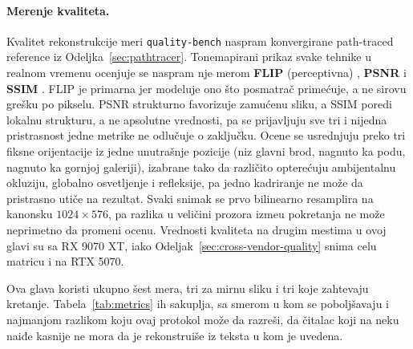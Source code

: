 \paragraph{Merenje kvaliteta.} Kvalitet rekonstrukcije meri \texttt{quality-bench} naspram
konvergirane path-traced reference iz Odeljka~\ref{sec:pathtracer}. Tonemapirani prikaz svake tehnike u realnom vremenu
ocenjuje se naspram nje merom \textbf{FLIP} (perceptivna) \cite{andersson2020flip},
\textbf{PSNR} i \textbf{SSIM} \cite{wang2004ssim}. FLIP je primarna jer modeluje ono \v{s}to posmatra\v{c}
primećuje, a ne sirovu gre\v{s}ku po pikselu. PSNR strukturno favorizuje zamu\'cenu sliku, a SSIM poredi lokalnu strukturu, a ne
apsolutne vrednosti, pa se prijavljuju sve tri i nijedna pristrasnost jedne metrike ne odlu\v{c}uje o zaklju\v{c}ku.
Ocene se usrednjuju preko tri fiksne orijentacije iz jedne unutra\v{s}nje pozicije (niz glavni brod, nagnuto
ka podu, nagnuto ka gornjoj galeriji), izabrane tako da razli\v{c}ito optere\'cuju ambijentalnu okluziju, globalno osvetljenje
i refleksije, pa jedno kadriranje ne mo\v{z}e da pristrasno utiče na rezultat. Svaki snimak se prvo bilinearno
resamplira na kanonsku $1024 \times 576$, pa razlika u veli\v{c}ini prozora izme\dj{}u pokretanja ne mo\v{z}e neprimetno da promeni ocenu. Vrednosti kvaliteta na drugim mestima u ovoj glavi
su sa RX 9070 XT, iako Odeljak~\ref{sec:cross-vendor-quality} snima celu matricu i na
RTX 5070.

Ova glava koristi ukupno \v{s}est mera, tri za mirnu sliku i tri koje zahtevaju kretanje.
Tabela~\ref{tab:metrics} ih sakuplja, sa smerom u kom se pobolj\v{s}avaju i najmanjom
razlikom koju ovaj protokol mo\v{z}e da razre\v{s}i, da \v{c}italac koji na neku naiđe kasnije ne mora
da je rekonstrui\v{s}e iz teksta u kom je uvedena.

